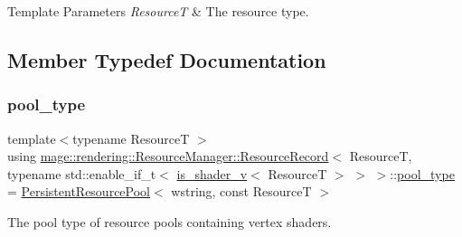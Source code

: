 \begin{DoxyTemplParams}{Template Parameters}
{\em ResourceT} & The resource type. \\
\hline
\end{DoxyTemplParams}


\subsection{Member Typedef Documentation}
\mbox{\label{structmage_1_1rendering_1_1_resource_manager_1_1_resource_record_3_01_resource_t_00_01typename_09b062ee4b0394619806084252c69f48d_a5f755d5452be9da7f699b8545a97337f}} 
\subsubsection{\texorpdfstring{pool\+\_\+type}{pool\_type}}
{\footnotesize\ttfamily template$<$typename ResourceT $>$ \\
using \mbox{\hyperlink{structmage_1_1rendering_1_1_resource_manager_1_1_resource_record}{mage\+::rendering\+::\+Resource\+Manager\+::\+Resource\+Record}}$<$ ResourceT, typename std\+::enable\+\_\+if\+\_\+t$<$ \mbox{\hyperlink{namespacemage_1_1rendering_a31fdbf9c96bd42e878e844c2b32b2fb9}{is\+\_\+shader\+\_\+v}}$<$ ResourceT $>$ $>$ $>$\+::\mbox{\hyperlink{structmage_1_1rendering_1_1_resource_manager_1_1_resource_record_3_01_resource_t_00_01typename_09b062ee4b0394619806084252c69f48d_a5f755d5452be9da7f699b8545a97337f}{pool\+\_\+type}} =  \mbox{\hyperlink{classmage_1_1_persistent_resource_pool}{Persistent\+Resource\+Pool}}$<$ wstring, const ResourceT $>$}

The pool type of resource pools containing vertex shaders. 